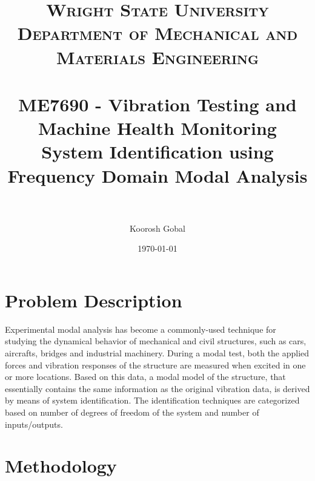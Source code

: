 \documentclass[paper=a4, fontsize=12pt]{scrartcl} %
\title{	
\normalfont \normalsize 
\textsc{Wright State University\\ Department of Mechanical and Materials Engineering} \\ [25pt] %
\horrule{0.5pt} \\[0.4cm] %
\large ME7690 - Vibration Testing and Machine Health Monitoring \\ %
\huge System Identification using Frequency Domain Modal Analysis\\
\horrule{2pt} \\[0.5cm] %
}
\author{Koorosh Gobal} %
\date{\normalsize\today} %
\begin{document}
\maketitle %

\section*{Problem Description}
Experimental modal analysis has become a commonly-used technique for studying the dynamical behavior of mechanical and civil structures, such as cars, aircrafts, bridges and industrial machinery. During a modal test, both the applied forces and vibration responses of the structure are measured when excited in one or more locations. Based on this data, a modal model of the structure, that essentially contains the same information as the original vibration data, is derived by means of system identification. The identification techniques are categorized based on number of degrees of freedom of the system and number of inputs/outputs.
\section*{Methodology}
\end{document}
